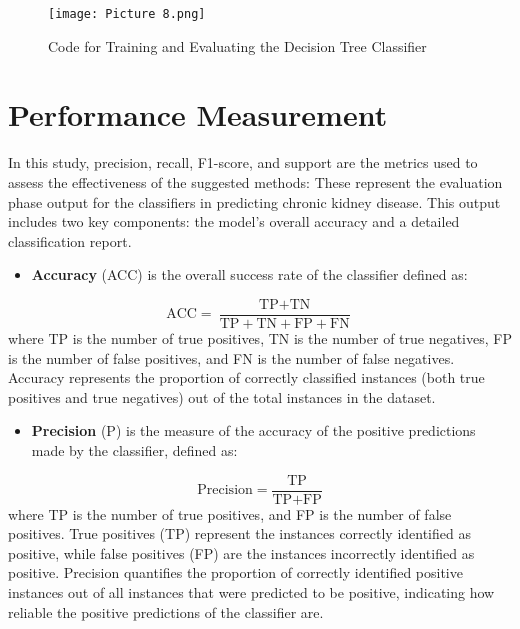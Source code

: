 \documentclass[conference]{IEEEtran}
\begin{document}
\begin{figure}
\centering
\texttt{[image: Picture 8.png]}
\caption{Code for Training and Evaluating the Decision Tree Classifier} 
\label{fig8}
\end{figure}

\section{Performance Measurement}
In this study, precision, recall, F1-score, and support are the metrics used to assess the effectiveness of the suggested methods: These represent the evaluation phase output for the classifiers in predicting chronic kidney disease. This output includes two key components: the model's overall accuracy and a detailed classification report.

\begin{itemize}
    \item \textbf{Accuracy} (ACC) is the overall success rate of the classifier defined as:
\end{itemize}

\begin{equation*}
\text{ACC} = \frac{\text{TP} + \text{TN}}{\text{TP} + \text{TN} + \text{FP} + \text{FN}}
\end{equation*}
where TP is the number of true positives, TN is the number of true negatives, FP is the number of false positives, and FN is the number of false negatives. Accuracy represents the proportion of correctly classified instances (both true positives and true negatives) out of the total instances in the dataset.

\begin{itemize}
    \item \textbf{Precision} (P) is the measure of the accuracy of the positive predictions made by the classifier, defined as:
\end{itemize}
\begin{equation*}
\text{Precision} = \frac{\text{TP}}{\text{TP} + \text{FP}}
\end{equation*}
where TP is the number of true positives, and FP is the number of false positives. True positives (TP) represent the instances correctly identified as positive, while false positives (FP) are the instances incorrectly identified as positive. Precision quantifies the proportion of correctly identified positive instances out of all instances that were predicted to be positive, indicating how reliable the positive predictions of the classifier are.
\end{document}
